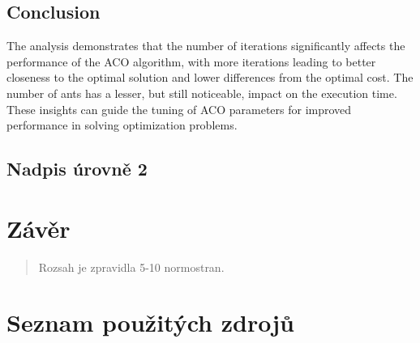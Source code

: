 \documentclass[
]{article}
\begin{document}
    \subsection{Conclusion}\label{subsec:conclusion}
    The analysis demonstrates that the number of iterations significantly affects the performance of the ACO algorithm, with more iterations leading to better closeness to the optimal solution and lower differences from the optimal cost. The number of ants has a lesser, but still noticeable, impact on the execution time. These insights can guide the tuning of ACO parameters for improved performance in solving optimization problems.



    \hypertarget{nadpis-uxfarovnux11b-2-2}{%

        \subsection{Nadpis úrovně 2}\label{nadpis-uxfarovnux11b-2-2}}




    \newpage
    \hypertarget{zuxe1vux11br}{%


        \section{Závěr}\label{zuxe1vux11br}}

    \begin{quote}
        Rozsah je zpravidla 5-10 normostran.
    \end{quote}

    \newpage
    \hypertarget{seznam-pouux17eituxfdch-zdrojux16f}{%
        \section{Seznam použitých
        zdrojů}\label{seznam-pouux17eituxfdch-zdrojux16f}}
\end{document}
